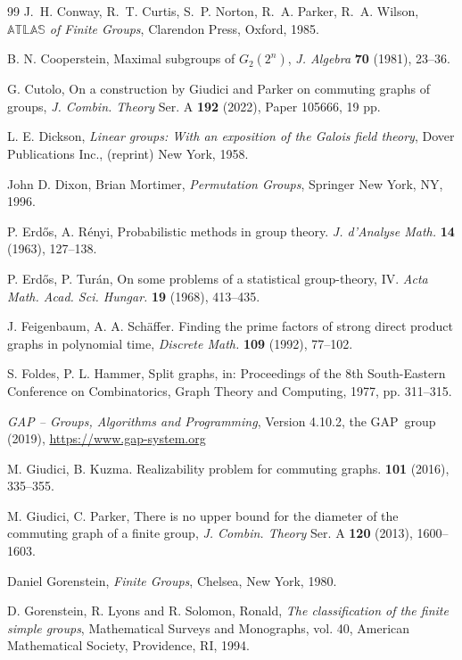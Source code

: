 \documentclass{elsarticle}
\begin{document}
\begin{thebibliography}{99}
J.~H. Conway, R.~T. Curtis, S.~P. Norton, R.~A. Parker,
R.~A. Wilson,
\textit{$\mathbb{ATLAS}$ of Finite Groups},
Clarendon Press, Oxford, 1985.

B. N. Cooperstein,
Maximal subgroups of $G_2(2^n)$,
\textit{J. Algebra} \textbf{70} (1981), 23--36.

G. Cutolo,
On a construction by Giudici and Parker on commuting graphs of groups,
\textit{J. Combin. Theory} Ser. A \textbf{192} (2022), Paper 105666, 19 pp.

L. E. Dickson,
\textit{Linear groups: With an exposition of the Galois field theory},
Dover Publications Inc., (reprint) New York, 1958.

John D. Dixon, Brian Mortimer,
\textit{Permutation Groups},
Springer New York, NY, 1996.

P. Erd\H{o}s, A. R\'{e}nyi,
Probabilistic methods in group theory.
\textit{J. d'Analyse Math.} \textbf{14} (1963), 127--138.

P. Erd\H{o}s, P. Tur\'an,
On some problems of a statistical group-theory, IV.
\textit{Acta Math. Acad. Sci. Hungar.} \textbf{19} (1968), 413--435.

J. Feigenbaum, A. A. Sch\"affer.
Finding the prime factors of strong direct product graphs in polynomial time,
\textit{Discrete Math.} \textbf{109} (1992), 77--102.

S. Foldes, P. L. Hammer,
Split graphs, in:
Proceedings of the $8$th South-Eastern Conference on Combinatorics, Graph
Theory and Computing, 1977, pp. 311--315.

\textit{GAP -- Groups, Algorithms and Programming}, Version 4.10.2,
the GAP~group (2019), \url{https://www.gap-system.org}

M. Giudici, B. Kuzma.
\newblock Realizability problem for commuting graphs.
 \textbf{101} (2016), 335--355.

 M. Giudici, C. Parker,
There is no upper bound for the diameter of the commuting graph of a finite
group,
\textit{J. Combin. Theory} Ser. A \textbf{120} (2013), 1600--1603.

Daniel Gorenstein,
\textit{Finite Groups},
Chelsea, New York, 1980.

D. Gorenstein, R. Lyons and R. Solomon, Ronald,
\textit{The classification of the finite simple groups},
Mathematical Surveys and Monographs, vol. 40,
American Mathematical Society, Providence, RI, 1994.


\end{thebibliography}
\end{document}
